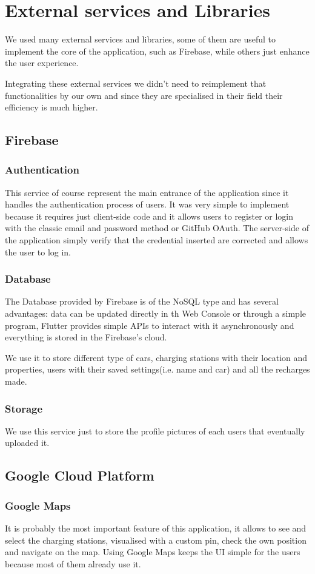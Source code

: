 \chapter{External services and Libraries}
\label{chap:externalServices}
We used many external services and libraries, some of them are useful to implement the core of the application, such as Firebase, while others just enhance the user experience. 

Integrating these external services we didn't need to reimplement that functionalities by our own and since they are specialised in their field their efficiency is much higher. 
\section{Firebase}
\subsection{Authentication}
This service of course represent the main entrance of the application since it handles the authentication process of users. It was very simple to implement because it requires just client-side code and it allows users to register or login with the classic email and password method or GitHub OAuth. The server-side of the application simply verify that the credential inserted are corrected and allows the user to log in.
\subsection{Database}
The Database provided by Firebase is of the NoSQL type and has several advantages: data can be updated directly in th Web Console or through a simple program, Flutter provides simple APIs to interact with it asynchronously and everything is stored in the Firebase's cloud. 

We use it to store different type of cars, charging stations with their location and properties, users with their saved settings(i.e. name and car) and all the recharges made. 
\subsection{Storage}
We use this service just to store the profile pictures of each users that eventually uploaded it. 
\section{Google Cloud Platform}
\subsection{Google Maps}
It is probably the most important feature of this application, it allows to see and select the charging stations, visualised with a custom pin, check the own position and navigate on the map. Using Google Maps keeps the UI simple for the users because most of them already use it. 

